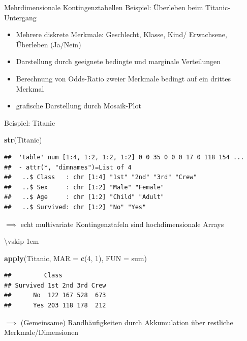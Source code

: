 \documentclass[
  10pt,
  ignorenonframetext,
]{beamer}
\newenvironment{Shaded}{\begin{snugshade}}{\end{snugshade}}
\newcommand{\AttributeTok}[1]{\textcolor[rgb]{0.13,0.29,0.53}{#1}}
\newcommand{\DecValTok}[1]{\textcolor[rgb]{0.00,0.00,0.81}{#1}}
\newcommand{\FunctionTok}[1]{\textcolor[rgb]{0.13,0.29,0.53}{\textbf{#1}}}
\newcommand{\NormalTok}[1]{#1}
\providecommand{\tightlist}{%
  \setlength{\itemsep}{0pt}\setlength{\parskip}{0pt}}
\begin{document}
\begin{frame}{Mehrdimensionale Kontingenztabellen}
\label{mehrdimensionale-kontingenztabellen}
Beispiel: Überleben beim Titanic-Untergang

\begin{itemize}
\tightlist
\item
  Mehrere diskrete Merkmale: Geschlecht, Klasse, Kind/ Erwachsene,
  Überleben (Ja/Nein)
\item
  Darstellung durch geeignete bedingte und marginale Verteilungen
\item
  Berechnung von Odds-Ratio zweier Merkmale bedingt auf ein drittes
  Merkmal
\item
  grafische Darstellung durch Mosaik-Plot
\end{itemize}
\end{frame}

\begin{frame}[fragile]{Beispiel: Titanic}
\label{beispiel-titanic}
\scriptsize

\begin{Shaded}
\begin{Highlighting}[]
\FunctionTok{str}\NormalTok{(Titanic)}
\end{Highlighting}
\end{Shaded}

\begin{verbatim}
##  'table' num [1:4, 1:2, 1:2, 1:2] 0 0 35 0 0 0 17 0 118 154 ...
##  - attr(*, "dimnames")=List of 4
##   ..$ Class   : chr [1:4] "1st" "2nd" "3rd" "Crew"
##   ..$ Sex     : chr [1:2] "Male" "Female"
##   ..$ Age     : chr [1:2] "Child" "Adult"
##   ..$ Survived: chr [1:2] "No" "Yes"
\end{verbatim}

\normalsize

\(\implies\) echt multivariate Kontingenztafeln sind hochdimensionale
Arrays

\textbackslash vskip 1em

\scriptsize

\begin{Shaded}
\begin{Highlighting}[]
\FunctionTok{apply}\NormalTok{(Titanic, }\AttributeTok{MAR =} \FunctionTok{c}\NormalTok{(}\DecValTok{4}\NormalTok{, }\DecValTok{1}\NormalTok{), }\AttributeTok{FUN =}\NormalTok{ sum)}
\end{Highlighting}
\end{Shaded}

\begin{verbatim}
##         Class
## Survived 1st 2nd 3rd Crew
##      No  122 167 528  673
##      Yes 203 118 178  212
\end{verbatim}

\normalsize

\(\implies\) (Gemeinsame) Randhäufigkeiten durch Akkumulation über
restliche Merkmale/Dimensionen
\end{frame}
\end{document}
